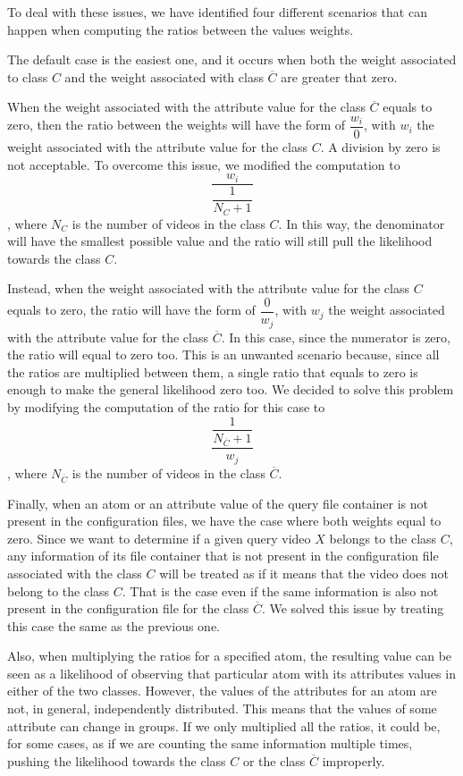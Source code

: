 To deal with these issues, we have identified four different scenarios that can happen when computing the ratios between the values weights.

The default case is the easiest one, and it occurs when both the weight associated to class $C$ and the weight associated with class $\overline{C}$ are greater that zero.

When the weight associated with the attribute value for the class $\overline{C}$ equals to zero, then the ratio between the weights will have the form of $ \dfrac{w_{i}}{0} $, with $w_{i}$ the weight associated with the attribute value for the class $C$. A division by zero is not acceptable. To overcome this issue, we modified the computation to $$ \dfrac{w_{i}}{\dfrac{1}{N_{C} + 1}} $$, where $N_{C}$ is the number of videos in the class $C$. In this way, the denominator will have the smallest possible value and the ratio will still pull the likelihood towards the class $C$.

Instead, when the weight associated with the attribute value for the class $C$ equals to zero, the ratio will have the form of $ \dfrac{0}{w_{j}} $, with $w_{j}$ the weight associated with the attribute value for the class $\overline{C}$. In this case, since the numerator is zero, the ratio will equal to zero too. This is an unwanted scenario because, since all the ratios are multiplied between them, a single ratio that equals to zero is enough to make the general likelihood zero too. We decided to solve this problem by modifying the computation of the ratio for this case to $$ \dfrac{\dfrac{1}{N_{\overline{C}} + 1}}{w_{j}} $$, where $N_{\overline{C}}$ is the number of videos in the class $\overline{C}$.

Finally, when an atom or an attribute value of the query file container is not present in the configuration files, we have the case where both weights equal to zero. Since we want to determine if a given query video $X$ belongs to the class $C$, any information of its file container that is not present in the configuration file associated with the class $C$ will be treated as if it means that the video does not belong to the class $C$. That is the case even if the same information is also not present in the configuration file for the class $\overline{C}$. We solved this issue by treating this case the same as the previous one.

Also, when multiplying the ratios for a specified atom, the resulting value can be seen as a likelihood of observing that particular atom with its attributes values in either of the two classes. However, the values of the attributes for an atom are not, in general, independently distributed. This means that the values of some attribute can change in groups. If we only multiplied all the ratios, it could be, for some cases, as if we are counting the same information multiple times, pushing the likelihood towards the class $C$ or the class $\overline{C}$ improperly.

